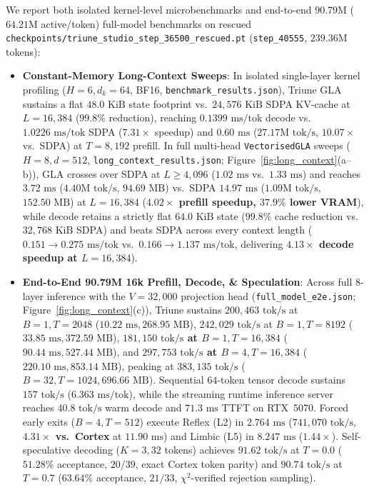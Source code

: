 \documentclass[10pt,twocolumn,letterpaper]{article}
\begin{document}
We report both isolated kernel-level microbenchmarks and end-to-end $90.79\text{M}$ ($64.21\text{M}$ active/token) full-model benchmarks on rescued \texttt{checkpoints/triune\_studio\_step\_36500\_rescued.pt} (\texttt{step\_40555}, $239.36\text{M}$ tokens):
\begin{itemize}
    \item \textbf{Constant-Memory Long-Context Sweeps}: In isolated single-layer kernel profiling ($H=6, d_k=64$, BF16, \texttt{benchmark\_results.json}), Triune GLA sustains a flat $48.0\text{ KiB}$ state footprint vs.\ $24,576\text{ KiB}$ SDPA KV-cache at $L=16,384$ ($99.8\%$ reduction), reaching $0.1399\text{ ms/tok}$ decode vs.\ $1.0226\text{ ms/tok}$ SDPA ($7.31\times$ speedup) and $0.60\text{ ms}$ ($27.17\text{M tok/s}$, $10.07\times$ vs.\ SDPA) at $T=8,192$ prefill. In full multi-head \texttt{VectorisedGLA} sweeps ($H=8, d=512$, \texttt{long\_context\_results.json}; Figure~\ref{fig:long_context}(a--b)), GLA crosses over SDPA at $L \ge 4,096$ ($1.02\text{ ms}$ vs.\ $1.33\text{ ms}$) and reaches $3.72\text{ ms}$ ($4.40\text{M tok/s}$, $94.69\text{ MB}$) vs.\ SDPA $14.97\text{ ms}$ ($1.09\text{M tok/s}$, $152.50\text{ MB}$) at $L=16,384$ (\textbf{$4.02\times$ prefill speedup, $37.9\%$ lower VRAM}), while decode retains a strictly flat $64.0\text{ KiB}$ state ($99.8\%$ cache reduction vs.\ $32,768\text{ KiB}$ SDPA) and beats SDPA across every context length ($0.151 \to 0.275\text{ ms/tok}$ vs.\ $0.166 \to 1.137\text{ ms/tok}$, delivering \textbf{$4.13\times$ decode speedup at $L=16,384$}).
    \item \textbf{End-to-End 90.79M 16k Prefill, Decode, \& Speculation}: Across full 8-layer inference with the $V=32,000$ projection head (\texttt{full\_model\_e2e.json}; Figure~\ref{fig:long_context}(c)), Triune sustains $200,463\text{ tok/s}$ at $B=1, T=2048$ ($10.22\text{ ms}, 268.95\text{ MB}$), $242,029\text{ tok/s}$ at $B=1, T=8192$ ($33.85\text{ ms}, 372.59\text{ MB}$), \textbf{$181,150\text{ tok/s}$ at $B=1, T=16,384$} ($90.44\text{ ms}, 527.44\text{ MB}$), and \textbf{$297,753\text{ tok/s}$ at $B=4, T=16,384$} ($220.10\text{ ms}, 853.14\text{ MB}$), peaking at $383,135\text{ tok/s}$ ($B=32, T=1024, 696.66\text{ MB}$). Sequential $64$-token tensor decode sustains $157\text{ tok/s}$ ($6.363\text{ ms/tok}$), while the streaming runtime inference server reaches $40.8\text{ tok/s}$ warm decode and $71.3\text{ ms}$ TTFT on RTX~5070. Forced early exits ($B=4, T=512$) execute Reflex (L2) in $2.764\text{ ms}$ ($741,070\text{ tok/s}$, \textbf{$4.31\times$ vs.\ Cortex} at $11.90\text{ ms}$) and Limbic (L5) in $8.247\text{ ms}$ ($1.44\times$). Self-speculative decoding ($K=3, 32$ tokens) achieves $91.62\text{ tok/s}$ at $T=0.0$ ($51.28\%$ acceptance, $20/39$, exact Cortex token parity) and $90.74\text{ tok/s}$ at $T=0.7$ ($63.64\%$ acceptance, $21/33$, $\chi^2$-verified rejection sampling).

\end{itemize}
\end{document}
